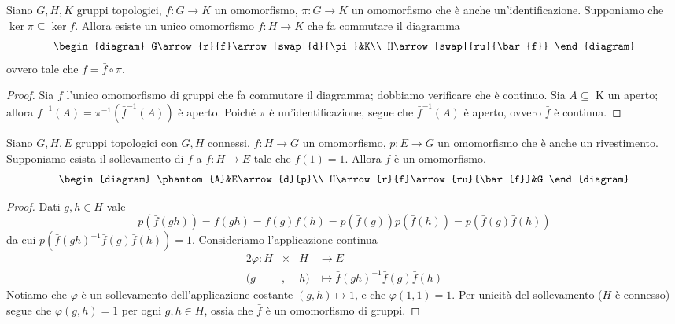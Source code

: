 \begin{proposition}
Siano $G\comma H\comma K$ gruppi topologici, $f:G\to K$ un omomorfismo, $\pi:G\to K$ un omomorfismo che è anche un'identificazione. Supponiamo che $\ker\pi\subseteq\ker f$. Allora esiste un unico omomorfismo $\bar{f}:H\to K$ che fa commutare il diagramma
$$
\begin{diagram}
G\arrow{r}{f}\arrow[swap]{d}{\pi}&K\\
H\arrow[swap]{ru}{\bar{f}}
\end{diagram}
$$
ovvero tale che $f=\bar{f}\circ\pi$.
\end{proposition}
\begin{proof}
Sia $\bar{f}$ l'unico omomorfismo di gruppi che fa commutare il diagramma; dobbiamo verificare che è continuo. Sia $A\subseteq$ K un aperto; allora $f^{-1}(A)=\pi^{-1}(\bar{f}^{-1}(A))$ è aperto. Poiché $\pi$ è un'identificazione, segue che $\bar{f}^{-1}(A)$ è aperto, ovvero $\bar{f}$ è continua.
\end{proof}

\begin{proposition}
Siano $G\comma H\comma E$ gruppi topologici con $G\comma H$ connessi, $f:H\to G$ un omomorfismo, $p:E\to G$ un omomorfismo che è anche un rivestimento. Supponiamo esista il sollevamento di $f$ a $\bar{f}:H\to E$ tale che $\bar{f}(1)=1$. Allora $\bar{f}$ è un omomorfismo.
$$
\begin{diagram}
\phantom{A}&E\arrow{d}{p}\\
H\arrow{r}{f}\arrow{ru}{\bar{f}}&G
\end{diagram}
$$
\end{proposition}
\begin{proof}
Dati $g,h\in H$ vale
$$
p(\bar{f}(gh))=f(gh)=f(g)f(h)=p(\bar{f}(g))p(\bar{f}(h))=p(\bar{f}(g)\bar{f}(h))
$$
da cui $p(\bar{f}(gh)^{-1}\bar{f}(g)\bar{f}(h))=1$. Consideriamo l'applicazione continua
\begin{alignat*}{2}
\varphi:H&\times &H&\longrightarrow E\\
(g&,&h)&\longmapsto\bar{f}(gh)^{-1}\bar{f}(g)\bar{f}(h)
\end{alignat*}
Notiamo che $\varphi$ è un sollevamento dell'applicazione costante $(g,h)\mapsto 1$, e che $\varphi(1,1)=1$. Per unicità del sollevamento ($H$ è connesso) segue che $\varphi(g,h)=1$ per ogni $g,h\in H$, ossia che $\bar{f}$ è un omomorfismo di gruppi.
\end{proof}

